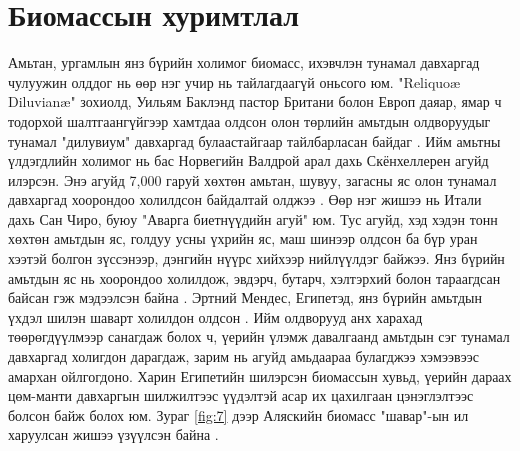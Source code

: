 \documentclass[10pt,twocolumn,letterpaper]{article}
\begin{document}


\section{Биомассын хуримтлал}

Амьтан, ургамлын янз бүрийн холимог биомасс, ихэвчлэн тунамал давхаргад чулуужин олддог нь өөр нэг учир нь тайлагдаагүй оньсого юм. "Reliquoæ Diluvianæ" зохиолд, Уильям Баклэнд пастор Британи болон Европ даяар, ямар ч тодорхой шалтгаангүйгээр хамтдаа олдсон олон төрлийн амьтдын олдворуудыг тунамал "дилувиум" давхаргад булаастайгаар тайлбарласан байдаг \cite{58}. Ийм амьтны үлдэгдлийн холимог нь бас Норвегийн Валдрой арал дахь Скёнхеллерен агуйд илэрсэн. Энэ агуйд 7,000 гаруй хөхтөн амьтан, шувуу, загасны яс олон тунамал давхаргад хоорондоо холилдсон байдалтай олджээ \cite{59}. Өөр нэг жишээ нь Итали дахь Сан Чиро, буюу "Аварга биетнүүдийн агуй" юм. Тус агуйд, хэд хэдэн тонн хөхтөн амьтдын яс, голдуу усны үхрийн яс, маш шинээр олдсон ба бүр уран хээтэй болгон зүссэнээр, дэнгийн нүүрс хийхээр нийлүүлдэг байжээ. Янз бүрийн амьтдын яс нь хоорондоо холилдож, эвдэрч, бутарч, хэлтэрхий болон тараагдсан байсан гэж мэдээлсэн байна \cite{60,61}. Эртний Мендес, Египетэд, янз бүрийн амьтдын үхдэл шилэн шаварт холилдон олдсон \cite{57}. Ийм олдворууд анх харахад төөрөгдүүлмээр санагдаж болох ч, үерийн үлэмж давалгаанд амьтдын сэг тунамал давхаргад холигдон дарагдаж, зарим нь агуйд амьдаараа булагджээ хэмээвээс амархан ойлгогдоно. Харин Египетийн шилэрсэн биомассын хувьд, үерийн дараах цөм-манти давхаргын шилжилтээс үүдэлтэй асар их цахилгаан цэнэглэлтээс болсон байж болох юм. Зураг \ref{fig:7} дээр Аляскийн биомасс "шавар"-ын ил харуулсан жишээ үзүүлсэн байна \cite{56}.
\end{document}

